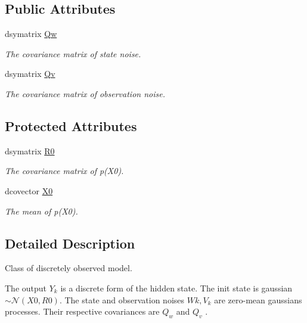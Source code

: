 \subsection*{Public Attributes}
\begin{CompactItemize}
\item 
dsymatrix \hyperlink{class_discrete___observed___model_970cc92956a6f09a0e65d0f572aa7588}{Qw}
\begin{CompactList}\small\item\em The covariance matrix of state noise. \item\end{CompactList}\item 
dsymatrix \hyperlink{class_discrete___observed___model_19b3aea69446339de9b2ae23bd8012c5}{Qv}
\begin{CompactList}\small\item\em The covariance matrix of observation noise. \item\end{CompactList}\end{CompactItemize}
\subsection*{Protected Attributes}
\begin{CompactItemize}
\item 
dsymatrix \hyperlink{class_discrete___observed___model_38c08725ba4da3181ca6efe7ccf77875}{R0}
\begin{CompactList}\small\item\em The covariance matrix of p(X0). \item\end{CompactList}\item 
dcovector \hyperlink{class_discrete___observed___model_ad95b6c00770d99943f579ab4511095c}{X0}
\begin{CompactList}\small\item\em The mean of p(X0). \item\end{CompactList}\end{CompactItemize}


\subsection{Detailed Description}
Class of discretely observed model. 

The output $Y_k$ is a discrete form of the hidden state. The init state is gaussian $ \sim \mathcal{N}(X0,R0)$. The state and observation noises $ Wk, V_k $ are zero-mean gaussians processes. Their respective covariances are $ Q_w $ and $ Q_v$ . 

